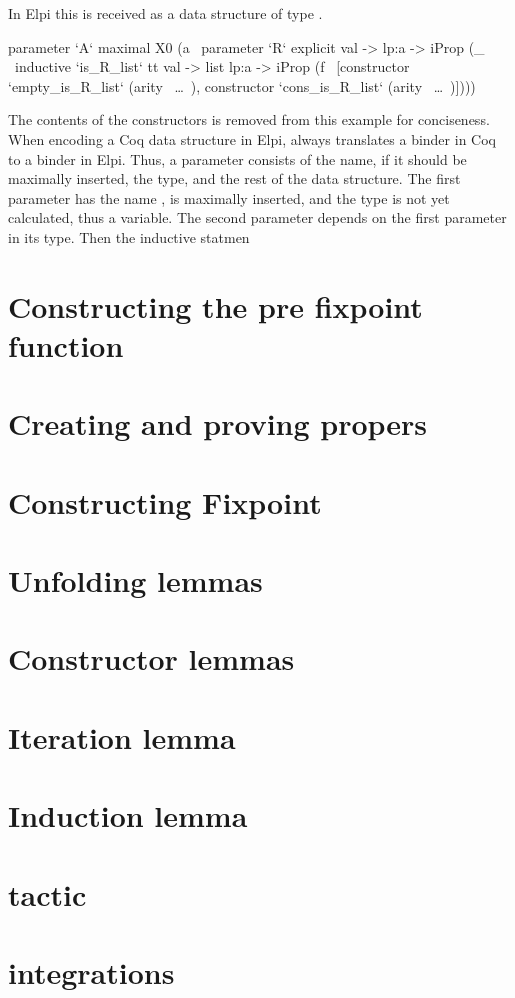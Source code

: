 \documentclass[thesis.tex]{subfiles}
\begin{document}
In Elpi this is received as a data structure of type .
\begin{elpicode}
  parameter `A` maximal 
    X0 
    (a \ parameter `R` explicit 
      {{ val -> lp:a -> iProp }} 
      (_ \ inductive `is_R_list` tt 
        {{ val -> list lp:a -> iProp }}
        (f \ [constructor `empty_is_R_list` 
                (arity ~\ldots~), 
              constructor `cons_is_R_list` 
                (arity ~\ldots~)])))
\end{elpicode}
The contents of the constructors is removed from this example for conciseness. When encoding a Coq data structure in Elpi, \ce always translates a binder in Coq to a binder in Elpi. Thus, a parameter consists of the name, if it should be maximally inserted, the type, and the rest of the data structure. The first parameter has the name , is maximally inserted, and the type is not yet calculated, thus a variable.  The second parameter depends on the first parameter in its type. Then the inductive statmen

\section{Constructing the pre fixpoint function}

\section{Creating and proving propers}

\section{Constructing Fixpoint}

\section{Unfolding lemmas}

\section{Constructor lemmas}

\section{Iteration lemma}

\section{Induction lemma}

\section{ tactic}\label{sec:inductiontactic}

\section{ integrations}\label{sec:indintros}
\end{document}
